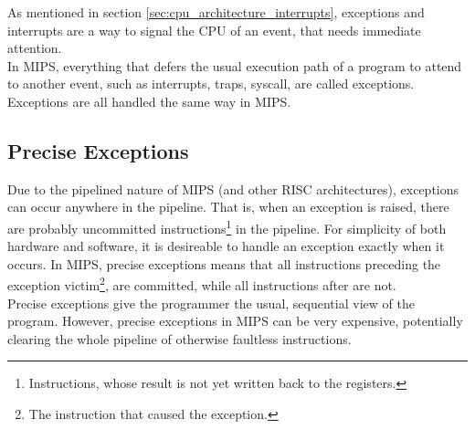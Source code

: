 \label{sec:exceptions}
As mentioned in section \ref{sec:cpu_architecture_interrupts}, exceptions and
interrupts are a way to signal the CPU of an event, that needs immediate
attention.\\
In MIPS, everything that defers the usual execution path of a program to attend to
another event, such as interrupts, traps, syscall, are called exceptions\cite{see_mips_run}.
Exceptions are all handled the same way in MIPS.

\subsection{Precise Exceptions}
Due to the pipelined nature of MIPS (and other RISC architectures), exceptions
can occur anywhere in the pipeline. That is, when an exception is raised, there
are probably uncommitted instructions\footnote{Instructions, whose result is not
yet written back to the registers.} in the pipeline. For simplicity of both hardware and
software, it is desireable to handle an exception exactly when it occurs. In
MIPS, precise exceptions means that all instructions preceding the exception
victim\footnote{The instruction that caused the exception.}, are committed, while
all instructions after are not.\\
Precise exceptions give the programmer the usual, sequential view of the
program. However, precise exceptions in MIPS can be very expensive, potentially
clearing the whole pipeline of otherwise faultless instructions.

